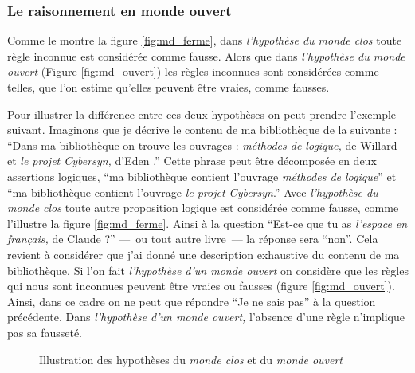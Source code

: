 
\subsubsection{Le raisonnement en monde ouvert}


Comme le montre la figure \ref{fig:md_ferme}, dans \emph{l'hypothèse
  du monde clos} toute règle inconnue est considérée comme
fausse. Alors que dans \emph{l'hypothèse du monde ouvert} (Figure
\ref{fig:md_ouvert}) les règles inconnues sont considérées comme
telles, \ie que l'on estime qu'elles peuvent être vraies, comme
fausses.

Pour illustrer la différence entre ces deux hypothèses on peut prendre
l'exemple suivant. Imaginons que je décrive le contenu de ma
bibliothèque de la suivante : \enquote{Dans ma bibliothèque on trouve
  les ouvrages : \emph{méthodes de logique,} de Willard  et
  \emph{le projet \emph{Cybersyn},} d'Eden .} Cette phrase
peut être décomposée en deux assertions logiques, \enquote{ma
  bibliothèque contient l'ouvrage \emph{méthodes de logique}} et
\enquote{ma bibliothèque contient l'ouvrage \emph{le projet
    \emph{Cybersyn}}.} Avec \emph{l'hypothèse du monde clos} toute
autre proposition logique est considérée comme fausse, comme
l'illustre la figure \ref{fig:md_ferme}. Ainsi à la question
\enquote{Est-ce que tu as \emph{l'espace en français,} de Claude
   ?} ---~ou tout autre livre~--- la réponse sera
\enquote{non}. Cela revient à considérer que j'ai donné une
description exhaustive du contenu de ma bibliothèque. Si l'on fait
\emph{l'hypothèse d'un monde ouvert} on considère que les règles qui
nous sont inconnues peuvent être vraies ou fausses (figure
\ref{fig:md_ouvert}). Ainsi, dans ce cadre on ne peut que répondre
\enquote{Je ne sais pas} à la question précédente. Dans
\emph{l'hypothèse d'un monde ouvert,} l’absence d'une règle n'implique
pas sa fausseté.

\begin{figure}
  \centering
  \subfloat[]{
    
    \label{fig:md_ferme}
  }\hspace{3cm}
  \subfloat[]{
    
    \label{fig:md_ouvert}
  }
  \caption{Illustration des hypothèses du \emph{monde clos}
    \protect{} et du \emph{monde ouvert}
    \protect{}}
  \label{fig:comp_md}
\end{figure}

